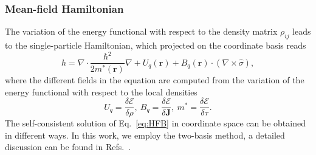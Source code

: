\documentclass[%
 reprint, linenumbers,
 amsmath,amssymb,
 aps, physrev
]{revtex4-2}
\begin{document}
\subsubsection{Mean-field Hamiltonian}
The variation of the energy functional with respect to the density matrix $\rho_{ij}$ leads to the single-particle Hamiltonian, which projected on the coordinate basis reads
\begin{equation}
h=\nabla\cdot\frac{\hbar^2}{2m^*(\boldsymbol{r})}\nabla+U_{q}(\boldsymbol r)+B_q(\boldsymbol r)\cdot(\nabla\times\hat\sigma),
\end{equation}
where the different fields in the equation are computed from the variation of the energy functional with respect to the local densities
\begin{equation}
U_q = \frac{\delta \mathcal E}{\delta \rho},\ B_q = \frac{\delta \mathcal E}{\delta \boldsymbol{J}},\ m^*=\frac{\delta \mathcal E}{\delta \tau}.
\end{equation}
The self-consistent solution of Eq.~\ref{eq:HFB} in coordinate space can be obtained in different ways. In this work, we employ the two-basis method, a detailed discussion can be found in Refs.~\cite{cr8,TERASAKI19951,two_basis_hg_bands}.
\end{document}

